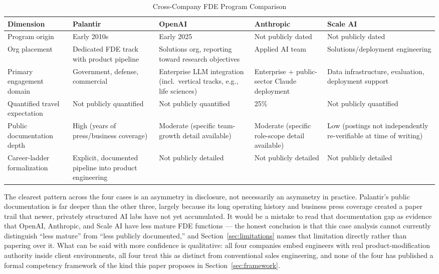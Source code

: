 \documentclass[journal]{IEEEtran}
\begin{document}
\begin{table}[t]
\caption{Cross-Company FDE Program Comparison}
\label{tab:crosscase}
\centering
\footnotesize
\begin{tabular}{p{2.6cm}p{3.4cm}p{3.4cm}p{3.4cm}p{3.4cm}}
\toprule
\rowcolor{ambercolor!15}
\textbf{Dimension} & \textbf{Palantir} & \textbf{OpenAI} & \textbf{Anthropic} & \textbf{Scale AI} \\
\midrule
\rowcolor{ambercolor!5}
Program origin & Early 2010s & Early 2025 & Not publicly dated & Not publicly dated \\
Org placement & Dedicated FDE track with product pipeline & Solutions org, reporting toward research objectives & Applied AI team & Solutions/deployment engineering \\
\rowcolor{ambercolor!5}
Primary engagement domain & Government, defense, commercial & Enterprise LLM integration (incl.\ vertical tracks, e.g., life sciences) & Enterprise + public-sector Claude deployment & Data infrastructure, evaluation, deployment support \\
Quantified travel expectation & Not publicly quantified & Not publicly quantified & 25\% \cite{anthropic2026fde} & Not publicly quantified \\
\rowcolor{ambercolor!5}
Public documentation depth & High (years of press/business coverage) & Moderate (specific team-growth detail available) & Moderate (specific role-scope detail available) & Low (postings not independently re-verifiable at time of writing) \\
Career-ladder formalization & Explicit, documented pipeline into product engineering \cite{orosz2025fde} & Not publicly detailed & Not publicly detailed & Not publicly detailed \\
\bottomrule
\end{tabular}
\end{table}

The clearest pattern across the four cases is an asymmetry in disclosure, not necessarily an asymmetry in practice. Palantir's public documentation is far deeper than the other three, largely because its long operating history and business press coverage created a paper trail that newer, privately structured AI labs have not yet accumulated. It would be a mistake to read that documentation gap as evidence that OpenAI, Anthropic, and Scale AI have less mature FDE functions --- the honest conclusion is that this case analysis cannot currently distinguish ``less mature'' from ``less publicly documented,'' and Section~\ref{sec:limitations} names that limitation directly rather than papering over it. What can be said with more confidence is qualitative: all four companies embed engineers with real product-modification authority inside client environments, all four treat this as distinct from conventional sales engineering, and none of the four has published a formal competency framework of the kind this paper proposes in Section~\ref{sec:framework}.
\end{document}
